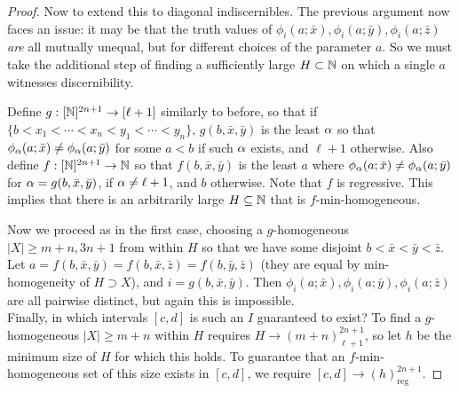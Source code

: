 \documentclass{amsart}
\begin{document}
\begin{proof}
		Now to extend this to diagonal indiscernibles. The previous argument now faces an issue: it may be that the truth values of $\phi_{i}(a;\bar{x}),\phi_i(a;\bar{y}),\phi_i(a;\bar{z})$ \textit{are} all mutually unequal, but for different choices of the parameter $a$. So we must take the additional step of finding a sufficiently large $H\subset \mathbb{N}$ on which a single $a$ witnesses discernibility. 
		
		Define $g:[\mathbb{N}]^{2n+1}\to [\ell+1]$ similarly to before, so that if $\{b<x_1<\cdots<x_n<y_1<\cdots<y_n\}$, $g(b,\bar{x},\bar{y})$ is the least $\alpha$ so that $\phi_{\alpha}(a;\bar{x})\neq \phi_{\alpha}(a;\bar{y})$ for some $a<b$ if such $\alpha$ exists, and $\ell+1$ otherwise. Also define $f:[\mathbb{N}]^{2n+1}\to \mathbb{N}$ so that $f(b,\bar{x},\bar{y})$ is the least $a$ where $\phi_{\alpha}(a;\bar{x})\neq \phi_{\alpha}(a;\bar{y})$ for $\alpha=g(b,\bar{x},\bar{y})$, if $\alpha\neq \ell+1$, and $b$ otherwise.
		Note that $f$ is regressive. This implies that there is an arbitrarily large $H\subseteq \mathbb{N}$ that is $f$-min-homogeneous.
		
		Now we proceed as in the first case, choosing a $g$-homogeneous $|X|\geq m+n,3n+1$ from within $H$ so that we have some disjoint $b < \bar{x} < \bar{y}< \bar{z}$. Let $a=f(b,\bar{x},\bar{y})=f(b,\bar{x},\bar{z})=f(b,\bar{y},\bar{z})$ (they are equal by min-homogeneity of $H\supset X$), and $i=g(b,\bar{x},\bar{y})$. Then $\phi_i(a;\bar{x}),\phi_i(a;\bar{y}),\phi_i(a;\bar{z})$ are all pairwise distinct, but again this is impossible.\\
		
		Finally, in which intervals $[c,d]$ is such an $I$ guaranteed to exist? To find a $g$-homogeneous $|X|\geq m+n$ within $H$ requires $H\to (m+n)^{2n+1}_{\ell+1}$, so let $h$ be the minimum size of $H$ for which this holds. To guarantee that an $f$-min-homogeneous set of this size exists in $[c,d]$, we require $[c,d]\to (h)_{\text{reg}}^{2n+1}$. 
%		
	\end{proof}\\
	
\end{document}
